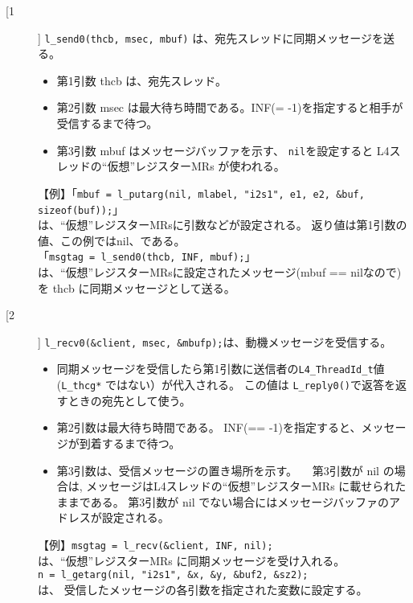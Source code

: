 \begin{description}
\item[[1]]
  \verb|l_send0(thcb, msec, mbuf)| は、宛先スレッドに同期メッセージを送る。
 
  \begin{itemize}
  \item  第1引数 thcb は、宛先スレッド。
  \item  第2引数 msec は最大待ち時間である。INF(= -1)を指定すると相手が受信するまで待つ。
  \item  第3引数  mbuf はメッセージバッファを示す、
    \verb|nil|を設定すると L4スレッドの``仮想''レジスターMRs が使われる。
  \end{itemize}

  【例】「\verb|mbuf = l_putarg(nil, mlabel, "i2s1", e1, e2, &buf, sizeof(buf));|」\\
    は、``仮想''レジスターMRsに引数などが設定される。
    返り値は第1引数の値、この例ではnil、である。\\
    「\verb|msgtag = l_send0(thcb, INF, mbuf);|」\\
    は、``仮想''レジスターMRsに設定されたメッセージ(mbuf == nilなので)を
    thcb に同期メッセージとして送る。


\item[[2]]
  \verb|l_recv0(&client, msec, &mbufp);|は、動機メッセージを受信する。

  \begin{itemize}
  \item  同期メッセージを受信したら第1引数に送信者の\verb|L4_ThreadId_t|値
    (\verb|L_thcg*| ではない）が代入される。
   この値は \verb|L_reply0()|で返答を返すときの宛先として使う。

  \item   第2引数は最大待ち時間である。
          INF(== -1)を指定すると、メッセージが到着するまで待つ。

  \item  第3引数は、受信メッセージの置き場所を示す。
  　第3引数が nil の場合は, メッセージはL4スレッドの``仮想''レジスターMRs に載せられたままである。
    第3引数が nil でない場合にはメッセージバッファのアドレスが設定される。
  \end{itemize}
   

  【例】\verb|msgtag = l_recv(&client, INF, nil);| \\
       は、``仮想''レジスターMRs に同期メッセージを受け入れる。\\
   \verb|n = l_getarg(nil, "i2s1", &x, &y, &buf2, &sz2);| \\
    は、 受信したメッセージの各引数を指定された変数に設定する。


\end{description}
